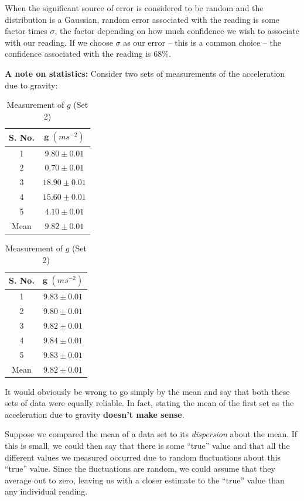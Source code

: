 When the significant source of error is considered to be random and the distribution is a Gaussian, random error associated with the reading is some factor times $\sigma$, the factor depending on how much confidence we wish to associate with our reading. If we choose $\sigma$ as our error -- this is a common choice -- the confidence associated with the reading is $68 \%$. 

\textbf{A note on statistics:} Consider two sets of measurements of the acceleration due to gravity:

\begin{table}[!htb]
\parbox{.45\linewidth}{
\centering
\begin{tabular}{cc}
\hline
\textbf{S. No.}&$\bm{g}\,\, (ms^{-2})$\\
\hline
1&$9.80\pm0.01$\\
2&$0.70\pm0.01$\\
3&$18.90\pm0.01$\\
4&$15.60\pm0.01$\\
5&$4.10\pm0.01$\\
\hline
Mean&$9.82\pm0.01$\\
\hline
\end{tabular}
\caption{Measurement of $g$ (Set 1)}
}
\hfill
\parbox{.45\linewidth}{
\centering
\begin{tabular}{cc}
\hline
\textbf{S. No.}&$\bm{g}\,\, (ms^{-2})$\\
\hline
1&$9.83\pm0.01$\\
2&$9.80\pm0.01$\\
3&$9.82\pm0.01$\\
4&$9.84\pm0.01$\\
5&$9.83\pm0.01$\\
\hline
Mean&$9.82\pm0.01$\\
\hline
\end{tabular}
\caption{Measurement of $g$ (Set 2)}
}
\end{table}

It would obviously be wrong to go simply by the mean and say that both these sets of data were equally reliable. In fact, stating the mean of the first set as the acceleration due to gravity \textbf{doesn't make sense}. 

Suppose we compared the mean of a data set to its \textit{dispersion} about the mean. If this is small, we could then say that there is some ``true'' value and that all the different values we measured occurred due to random fluctuations about this ``true'' value. Since the fluctuations are random, we could assume that they average out to zero, leaving us with a closer estimate to the ``true'' value than any individual reading.

